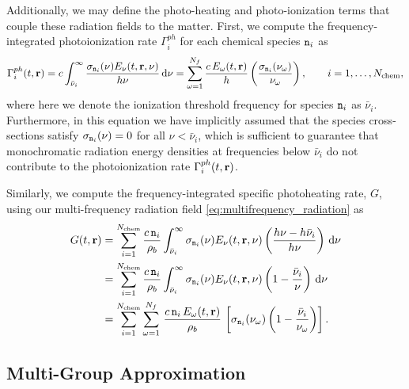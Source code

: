 \documentclass[10pt]{article}
\renewcommand{\(}{\left(}
\renewcommand{\)}{\right)}
\newcommand{\rvec}{{\bf r}}
\newcommand{\rhob}{\rho_b}
\newcommand{\Enu}{E_{\nu}}
\newcommand{\mn}{{\tt n}}
\begin{document}
Additionally, we may define the photo-heating and photo-ionization
terms that couple these radiation fields to the matter.  
First, we compute the frequency-integrated photoionization rate
$\Gamma_i^{ph}$ for each chemical species $\mn_i$ as
\begin{equation}
\label{eq:multifrequency_photoionization}
   \Gamma_i^{ph}(t,\rvec)  = 
   c \int_{\bar{\nu}_i}^{\infty} \frac{\sigma_{\mn_i}(\nu)\Enu(t,\rvec,\nu)}{h\nu}\,\mathrm d\nu =  
   \sum_{\omega=1}^{N_f} \frac{c\, E_{\omega}(t,\rvec)}{h} 
   \left(\frac{\sigma_{\mn_i}(\nu_{\omega})}{\nu_{\omega}}\right), 
   \qquad i=1,\ldots,N_\text{chem},
\end{equation}
where here we denote the ionization threshold frequency for species
$\mn_i$ as $\bar{\nu}_i$.  Furthermore, in this equation we have
implicitly assumed that the species cross-sections satisfy
$\sigma_{\mn_i}(\nu) = 0$ for all $\nu < \bar{\nu}_i$, which is
sufficient to guarantee that monochromatic radiation energy densities
at frequencies below $\bar{\nu}_i$ do not contribute to the
photoionization rate $\Gamma_i^{ph}(t,\rvec)$. 

Similarly, we compute the frequency-integrated specific photoheating
rate, $G$, using our multi-frequency radiation field
\eqref{eq:multifrequency_radiation} as 
\begin{align}
\notag
   G(t,\rvec) &= 
   \sum_{i=1}^{N_\text{chem}} \frac{c\, \mn_i}{\rhob}
     \int_{\bar{\nu}_i}^{\infty} \sigma_{\mn_i}(\nu) \Enu(t,\rvec,\nu)
     \left(\frac{h\nu - h\bar{\nu}_i}{h\nu}\right)\,\mathrm d\nu \\
\label{eq:multifrequency_photoheating}
   &= 
   \sum_{i=1}^{N_\text{chem}} \frac{c\, \mn_i}{\rhob}
     \int_{\bar{\nu}_i}^{\infty} \sigma_{\mn_i}(\nu) \Enu(t,\rvec,\nu)
     \left(1 - \frac{\bar{\nu}_i}{\nu}\right)\,\mathrm d\nu \\
\notag
   &= 
   \sum_{i=1}^{N_\text{chem}} \sum_{\omega=1}^{N_f}\,
     \frac{c\, \mn_i\, E_{\omega}(t,\rvec)}{\rhob}\,
     \left[\sigma_{\mn_i}(\nu_{\omega}) \left(1 -
       \frac{\bar{\nu}_i}{\nu_{\omega}}\right)\right]. 
\end{align}




\subsection{Multi-Group Approximation}
\label{subsec:multi_group}
\end{document}
